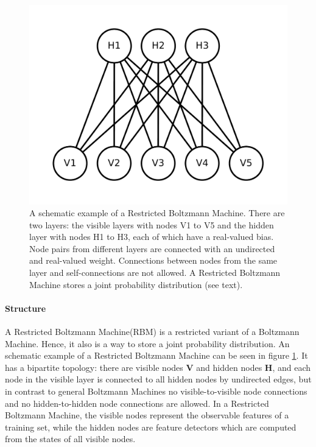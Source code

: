\begin{figure}
\begin{centering}
\includegraphics[width=0.55\columnwidth]{images/restricted-boltzmann-machine-example}
\par\end{centering}
\caption[A schematic example of a Restricted Boltzmann Machine.]{\label{fig:Restricted-Boltzmann-Machine-schema}A schematic example
of a Restricted Boltzmann Machine.  There are two layers: the visible
layers with nodes V1 to V5 and the hidden layer with nodes H1 to H3,
each of which have a real-valued bias. Node pairs from different layers
are connected with an undirected and real-valued weight. Connections
between nodes from the same layer and self-connections are not allowed.
A Restricted Boltzmann Machine stores a joint probability distribution
(see text).}
\end{figure}

\paragraph{Structure}

A Restricted Boltzmann Machine(RBM)
is a restricted variant of a Boltzmann Machine. Hence, it also is
a way to store a joint probability distribution. An schematic example
of a Restricted Boltzmann Machine can be seen in figure \ref{fig:Restricted-Boltzmann-Machine-schema}.
It has a bipartite topology: there are visible nodes $\mathbf{V}$
and hidden nodes $\mathbf{H}$, and each node in the visible layer
is connected to all hidden nodes by undirected edges, but in contrast
to general Boltzmann Machines no visible-to-visible node connections
and no hidden-to-hidden node connections are allowed. In a Restricted
Boltzmann Machine, the visible nodes represent the observable features
of a training set, while the hidden nodes are feature detectors which
are computed from the states of all visible nodes.

